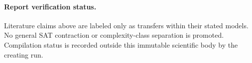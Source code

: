\documentclass[11pt]{article}
\begin{document}
\paragraph{Report verification status.}
Literature claims above are labeled only as transfers within their stated
models.  No general SAT contraction or complexity-class separation is
promoted.  Compilation status is recorded outside this immutable scientific
body by the creating run.

\end{document}
